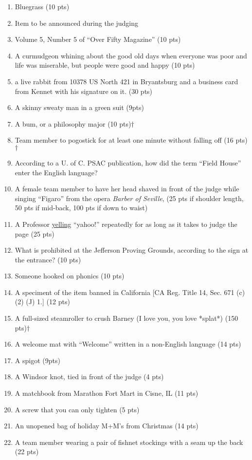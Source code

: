 \begin{enumerate}
\item Bluegrass (10 pts)
\item Item to be announced during the judging
\item Volume 5, Number 5 of ``Over Fifty Magazine'' (10 pts)
\item A curmudgeon whining about the good old days when everyone was poor and life was miserable, but people were good and happy (10 pts)
\item a live rabbit from 10378 US North 421 in Bryantsburg and a business card from Kennet with his signature on it. (30 pts)
\item A skinny sweaty man in a green suit (9pts)
\item A bum, or a philosophy major (10 pts)$\dagger$
\item Team member to pogostick for at least one minute without falling off (16 pts)$\dagger$
\item According to a U. of C. PSAC publication, how did the term ``Field House'' enter the English language?
\item A female team member to have her head shaved in front of the judge while singing ``Figaro'' from the opera {\it Barber of Seville}, (25 pts if shoulder length, 50 pts if mid-back, 100 pts if down to waist)
\item A {\UofC} Professor \underline{yelling} ``yahoo!'' repeatedly for as long as it takes to judge the page (25 pts)
\item What is prohibited at the Jefferson Proving Grounds, according to the sign at the entrance? (10 pts)
\item Someone hooked on phonics (10 pts)
\item A speciment of the item banned in California [CA Reg. Title 14, Sec. 671 (c) (2) (J) 1.] (12 pts)
\item A full-sized steamroller to crush Barney (I love you, you love *splat*) (150 pts)$\dagger$
\item A welcome mat with ``Welcome'' written in a non-English language (14 pts)
\item A spigot (9pts)
\item A Windsor knot, tied in front of the judge (4 pts)
\item A matchbook from Marathon Fort Mart in Cisne, IL (11 pts)
\item A screw that you can only tighten (5 pts)
\item An unopened bag of holiday M+M's{\texttrademark} from Christmas (14 pts)
\item A team member wearing a pair of fishnet stockings with a seam up the back (22 pts)

\end{enumerate}
